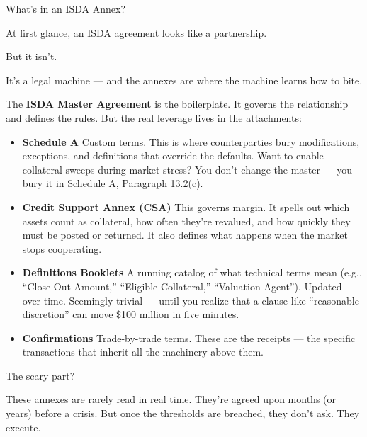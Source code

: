 \medskip

\begin{TechnicalSidebar}{What’s in an ISDA Annex?}

  At first glance, an ISDA agreement looks like a partnership.

  \medskip
  
  But it isn’t.

  \medskip
  
  It’s a legal machine — and the annexes are where the machine learns how to bite.
  
  \medskip
  
  The \textbf{ISDA Master Agreement} is the boilerplate. It governs the relationship and defines the rules. But the real leverage lives in the attachments:

  \medskip
  
  \begin{itemize}
    \item \textbf{Schedule A}  
    Custom terms. This is where counterparties bury modifications, exceptions, and definitions that override the defaults. Want to enable collateral sweeps during market stress? You don’t change the master — you bury it in Schedule A, Paragraph 13.2(c).
  
    \item \textbf{Credit Support Annex (CSA)}  
    This governs margin. It spells out which assets count as collateral, how often they’re revalued, and how quickly they must be posted or returned. It also defines what happens when the market stops cooperating.
  
    \item \textbf{Definitions Booklets}  
    A running catalog of what technical terms mean (e.g., “Close-Out Amount,” “Eligible Collateral,” “Valuation Agent”). Updated over time. Seemingly trivial — until you realize that a clause like “reasonable discretion” can move \$100 million in five minutes.
  
    \item \textbf{Confirmations}  
    Trade-by-trade terms. These are the receipts — the specific transactions that inherit all the machinery above them.
  \end{itemize}
  
  \medskip
  
  The scary part?

  \medskip
  
  These annexes are rarely read in real time.  
  They’re agreed upon months (or years) before a crisis.  
  But once the thresholds are breached, they don’t ask. They execute.
  
\end{TechnicalSidebar}

